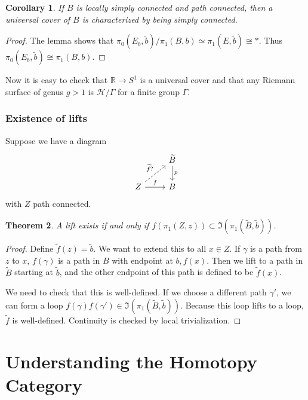 \documentclass[leqno, openany]{memoir}
\newtheorem{thm}{Theorem}[section]
\newtheorem{cor}[thm]{Corollary}
\theoremstyle{definition}
\theoremstyle{remark}
\theoremstyle{plain}
\theoremstyle{definition}
\theoremstyle{remark}
\newcommand{\R}{\mathbb{R}}
\newcommand{\mc}[1]{\mathcal{#1}}
\newcommand{\wt}[1]{\widetilde{#1}}
\begin{document}
\begin{cor}
    If $B$ is locally simply connected and path connected, then a universal cover of $B$ is characterized by being simply connected.
\end{cor}

\begin{proof}
    The lemma shows that $\pi_0(E_b, \wt{b}) / \pi_1(B,b) \simeq \pi_1(E,\wt{b}) \cong *$. Thus $\pi_0(E_b,\wt{b}) \cong \pi_1(B,b)$.
\end{proof}

Now it is easy to check that $\R \to S^1$ is a universal cover and that any Riemann surface of genus $g > 1$ is $\mc{H} / \Gamma$ for a finite group $\Gamma$.

\subsection{Existence of lifts}%
\label{sub:existence_of_lifts}

Suppose we have a diagram
\begin{equation}
\begin{tikzcd}
    & \wt{B} \arrow{d}{p} \\
    Z \arrow{r}{f} \arrow[dashrightarrow]{ur}{\wt{f}?} & B
\end{tikzcd}
\end{equation}
with $Z$ path connected.

\begin{thm}
    A lift exists if and only if $f(\pi_1(Z,z)) \subset \Im(\pi_1(\wt{B}, \wt{b}))$.
\end{thm}

\begin{proof}
    Define $\wt{f}(z) = \wt{b}$. We want to extend this to all $x \in Z$. If $\gamma$ is a path from $z$ to $x$, $f(\gamma)$ is a path in $B$ with endpoint at $b,f(x)$. Then we lift to a path in $\wt{B}$ starting at $\wt{b}$, and the other endpoint of this path is defined to be $\wt{f}(x)$.

    We need to check that this is well-defined. If we choose a different path $\gamma'$, we can form a loop $f(\gamma) f(\gamma') \in \Im(\pi_1(\wt{B},\wt{b}))$. Because this loop lifts to a loop, $\wt{f}$ is well-defined. Continuity is checked by local trivialization.
\end{proof}

\chapter{Understanding the Homotopy Category}%
\label{cha:homotopy_category}
\end{document}

